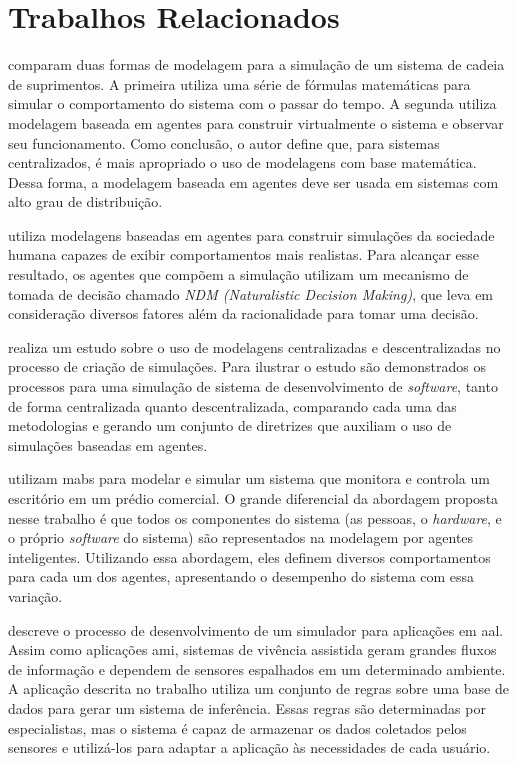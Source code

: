 \chapter{Trabalhos Relacionados}
\label{cap:trabalhos-relacionados}


 comparam duas formas de modelagem para a simulação de um sistema de cadeia de suprimentos. A primeira utiliza uma série de fórmulas matemáticas para simular o comportamento do sistema com o passar do tempo. A segunda utiliza  modelagem baseada em agentes para construir virtualmente o sistema e observar seu funcionamento. Como conclusão, o autor define que, para sistemas centralizados, é mais apropriado o uso de modelagens com base matemática. Dessa forma, a modelagem baseada em agentes deve ser usada em sistemas com alto grau de distribuição.

 utiliza modelagens baseadas em agentes para construir simulações da sociedade humana capazes de exibir comportamentos mais realistas. Para alcançar esse resultado, os agentes que compõem a simulação utilizam um mecanismo de tomada de decisão chamado \textit{NDM (Naturalistic Decision Making)}, que leva em consideração diversos fatores além da racionalidade para tomar uma decisão. 

 realiza um estudo sobre o uso de modelagens centralizadas e descentralizadas no processo de criação de simulações. Para ilustrar o estudo são demonstrados  os processos para uma simulação de sistema de desenvolvimento de \textit{software}, tanto de forma centralizada quanto descentralizada, comparando cada uma das metodologias e gerando um conjunto de diretrizes que auxiliam o uso de simulações baseadas em agentes.
 
 utilizam \acrshort{mabs} para modelar e simular um sistema que monitora e controla um escritório em um prédio comercial. O grande diferencial da abordagem proposta nesse trabalho é que todos os componentes do sistema (as pessoas, o \textit{hardware}, e o próprio \textit{software} do sistema)  são representados na modelagem por agentes inteligentes. Utilizando essa abordagem, eles definem diversos comportamentos para cada um dos agentes, apresentando o desempenho do sistema com essa variação.

 descreve o processo de desenvolvimento de um simulador para aplicações em \acrfull{aal}. Assim como aplicações \acrshort{ami}, sistemas de vivência assistida geram grandes fluxos de informação e dependem de sensores espalhados em um determinado ambiente. A aplicação descrita no trabalho utiliza um conjunto de regras sobre uma base de dados para gerar um sistema de inferência. Essas regras são determinadas por especialistas, mas o sistema é capaz de armazenar os dados coletados pelos sensores e utilizá-los para adaptar a aplicação às necessidades de cada usuário. 

